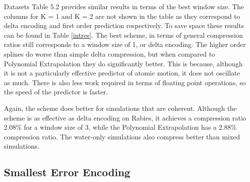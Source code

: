 \documentclass[a4paper,11pt]{report}
\begin{document}
\begin{section}{Datasets}
Table 5.2 provides similar results in terms of the best window size. The columns for K = 1 and K = 2 are not shown in the table as they correspond to delta encoding and first order prediction respectively. To save space these results can be found in Table \ref{intres}. The best scheme, in terms of general compression ratios still corresponds to a window size of 1, or delta encoding. The higher order splines do worse than simple delta compression, but when compared to Polynomial Extrapolation they do significantly better. This is because, although it is not a particularly effective predictor of atomic motion, it does not oscillate as much. There is also less work required in terms of floating point operations, so the speed of the predictor is faster.

Again, the scheme does better for simulations that are coherent. Although the scheme is as effective as delta encoding on Rabies, it achieves a compression ratio 2.08\% for a window size of 3, while the Polynomial Extrapolation has a 2.88\% compression ratio. The water-only simulations also compress better than mixed simulations.

\subsection{Smallest Error Encoding}


\end{section}
\end{document}
